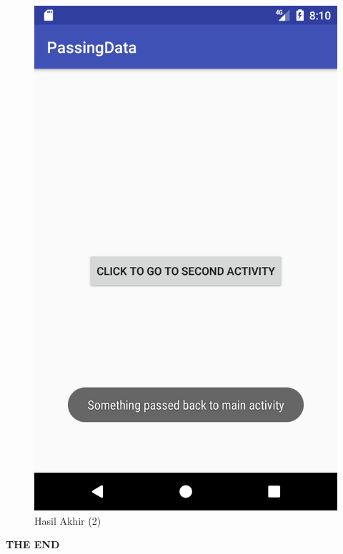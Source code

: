 \documentclass{scrartcl}
\begin{document}
\begin{enumerate}
\begin{figure}[htbp]
\begin{minipage}{.5\textwidth}
			\includegraphics[width=0.7\linewidth]{Screenshot_1496841057}
			\caption{Hasil Akhir (2)}
			\label{fig:screenshot_1496841057}
		\end{minipage}
	\end{figure}
	
\end{enumerate}
\vspace*{\fill}
\begin{center}
\large{\textbf{THE END}}
\end{center}
\end{document}
